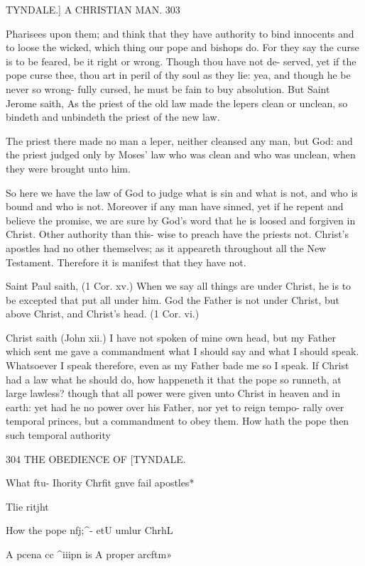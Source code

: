 \documentclass{custom}
\begin{document}
{TYNDALE.] A CHRISTIAN MAN. 303

Pharisees upon them; and think that they have authority to 
bind innocents and to loose the wicked, which thing our 
pope and bishops do. For they say the curse is to be
feared, be it right or wrong. Though thou have not de-
served, yet if the pope curse thee, thou art in peril of thy 
soul as they lie: yea, and though he be never so wrong- 
fully cursed, he must be fain to buy absolution. But
Saint Jerome saith, As the priest of the old law made the
lepers clean or unclean, so bindeth and unbindeth the 
priest of the new law. 

The priest there made no man a leper, neither cleansed 
any man, but God: and the priest judged only by Moses' 
law who was clean and who was unclean, when they were 
brought unto him. 

So here we have the law of God to judge what is sin and 
what is not, and who is bound and who is not. Moreover 
if any man have sinned, yet if he repent and believe the 
promise, we are sure by God's word that he is loosed 
and forgiven in Christ. Other authority than this- 
wise to preach have the priests not. Christ's apostles 
had no other themselves; as it appeareth throughout all 
the New Testament. Therefore it is manifest that they 
have not. 

Saint Paul saith, (1 Cor. xv.) When we say all things
are under Christ, he is to be excepted that put all under
him. God the Father is not under Christ, but above
Christ, and Christ's head. (1 Cor. vi.)

Christ saith (John xii.) I have not spoken of mine own
head, but my Father which sent me gave a commandment
what I should say and what I should speak. Whatsoever
I speak therefore, even as my Father bade me so I speak.
If Christ had a law what he should do, how happeneth it 
that the pope so runneth, at large lawless? though that all 
power were given unto Christ in heaven and in earth: yet 
had he no power over his Father, nor yet to reign tempo- 
rally over temporal princes, but a commandment to obey 
them. How hath the pope then such temporal authority 


304
THE OBEDIENCE OF
[TYNDALE.

What ftu- 
Ihority 
Chrfit gnve 
fail apostles* 

Tlie ritjht 

How the 
pope nfj;^- 
etU umlur 
ChrhL 

A pcena cc 
^iiipn is A 
proper 
arcftm» 

}
\end{document}
